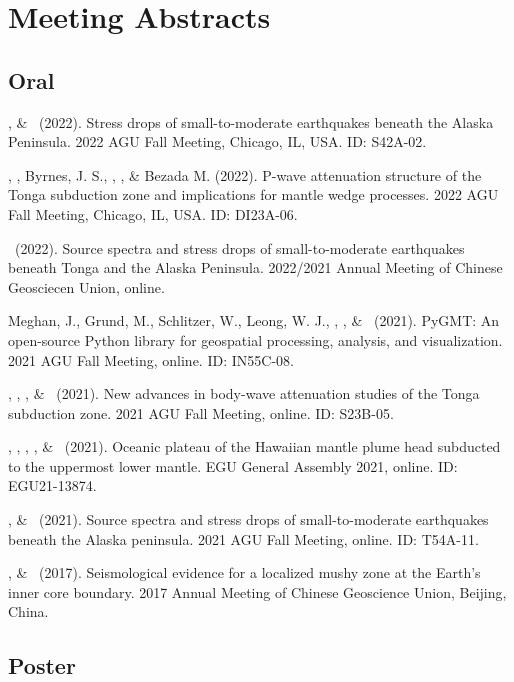 \section{Meeting Abstracts}

\subsection{Oral}

\begin{etaremune}
\item
    \SWei, \& \Me\ (2022).
    Stress drops of small-to-moderate earthquakes beneath the Alaska Peninsula.
    2022 AGU Fall Meeting, Chicago, IL, USA. ID: S42A-02.
\item
    \YZhang, \SWei, Byrnes, J. S., \Me, \FWang, \& Bezada M. (2022).
    P-wave attenuation structure of the Tonga subduction zone and implications for mantle wedge processes.
    2022 AGU Fall Meeting, Chicago, IL, USA. ID: DI23A-06.
\item
    \Me\ (2022).
    Source spectra and stress drops of small-to-moderate earthquakes beneath Tonga and the Alaska Peninsula.
    2022/2021 Annual Meeting of Chinese Geosciecen Union, online.
\item
    Meghan, J., Grund, M., Schlitzer, W., Leong, W. J., \Me, \JYao, \& \LUieda\ (2021).
    PyGMT: An open-source Python library for geospatial processing, analysis, and visualization.
    2021 AGU Fall Meeting, online. ID: IN55C-08.
\item
    \SWei, \YZhang, \Me, \& \DWiens\ (2021).
    New advances in body-wave attenuation studies of the Tonga subduction zone.
    2021 AGU Fall Meeting, online. ID: S23B-05.
\item
    \SWei, \PShearer, \CLithgowBertelloni, \LStixrude, \& \Me\ (2021).
    Oceanic plateau of the Hawaiian mantle plume head subducted to the uppermost lower mantle.
    EGU General Assembly 2021, online. ID: EGU21-13874.
\item
    \Me, \& \SWei\ (2021).
    Source spectra and stress drops of small-to-moderate earthquakes beneath the Alaska peninsula.
    2021 AGU Fall Meeting, online. ID: T54A-11.
\item
    \Me, \& \LWen\ (2017).
    Seismological evidence for a localized mushy zone at the Earth's inner core boundary.
    2017 Annual Meeting of Chinese Geoscience Union, Beijing, China.
\end{etaremune}

\subsection{Poster}

